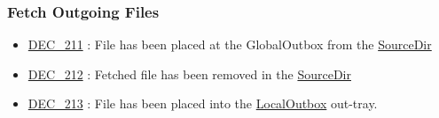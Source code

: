 \documentclass[dec_sum_main.tex]{subfiles}
\begin{document}
\subsubsection{Fetch Outgoing Files}

\begin{itemize}
    \item \hyperref[DEC212]{DEC\_211} : File has been placed at the GlobalOutbox from the \hyperref[SourceDir]{SourceDir}
    \item \hyperref[DEC212]{DEC\_212} : Fetched file has been removed in the \hyperref[SourceDir]{SourceDir}
    \item \hyperref[DEC213]{DEC\_213} : File has been placed into the \hyperref[LocalOutbox]{LocalOutbox} out-tray.
\end{itemize}
\end{document}

